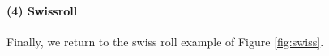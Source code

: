 \paragraph{(4) Swissroll} 
% 
Finally, we return to the swiss roll example of Figure \ref{fig:swiss}.







